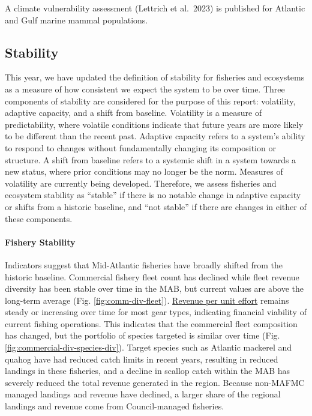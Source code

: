 \documentclass[
  10pt,
]{article}
\begin{document}
A climate vulnerability assessment (Lettrich et al.~2023) is published
for Atlantic and Gulf marine mammal populations.

\subsection{Stability}\label{stability}

This year, we have updated the definition of stability for fisheries and
ecosystems as a measure of how consistent we expect the system to be
over time. Three components of stability are considered for the purpose
of this report: volatility, adaptive capacity, and a shift from
baseline. Volatility is a measure of predictability, where volatile
conditions indicate that future years are more likely to be different
than the recent past. Adaptive capacity refers to a system's ability to
respond to changes without fundamentally changing its composition or
structure. A shift from baseline refers to a systemic shift in a system
towards a new status, where prior conditions may no longer be the norm.
Measures of volatility are currently being developed. Therefore, we
assess fisheries and ecosystem stability as ``stable'' if there is no
notable change in adaptive capacity or shifts from a historic baseline,
and ``not stable'' if there are changes in either of these components.

\paragraph{Fishery Stability}\label{fishery-stability}

Indicators suggest that Mid-Atlantic fisheries have broadly shifted from
the historic baseline. Commercial fishery fleet count has declined while
fleet revenue diversity has been stable over time in the MAB, but
current values are above the long-term average (Fig.
\ref{fig:comm-div-fleet}).
\href{https://noaa-edab.github.io/catalog/effective_sweptarea.html}{Revenue
per unit effort} remains steady or increasing over time for most gear
types, indicating financial viability of current fishing operations.
This indicates that the commercial fleet composition has changed, but
the portfolio of species targeted is similar over time (Fig.
\ref{fig:commercial-div-species-div}). Target species such as Atlantic
mackerel and quahog have had reduced catch limits in recent years,
resulting in reduced landings in these fisheries, and a decline in
scallop catch within the MAB has severely reduced the total revenue
generated in the region. Because non-MAFMC managed landings and revenue
have declined, a larger share of the regional landings and revenue come
from Council-managed fisheries.
\end{document}
